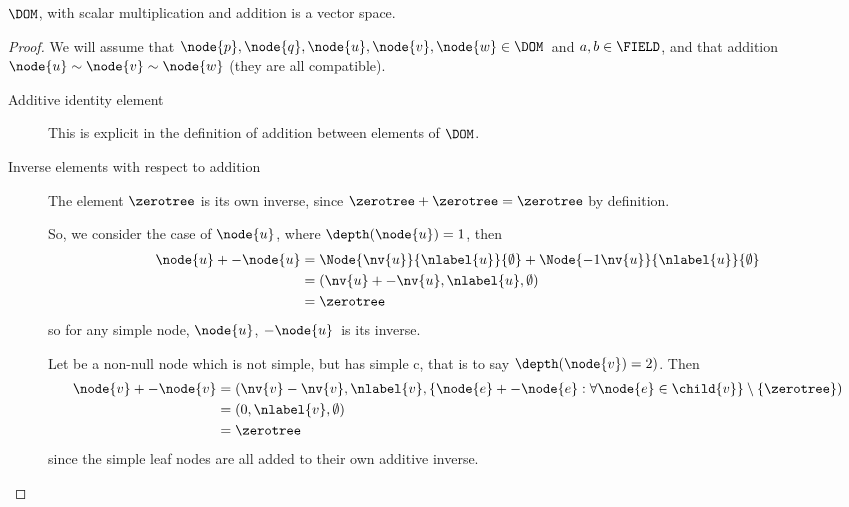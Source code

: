 \begin{proposition}\label{vspace} $\DOM$, with scalar multiplication and addition is a vector space.
  \begin{proof}
    We will assume that  \(\node{p}, \node{q}, \node{u},\node{v},\node{w} \in \DOM\)\ and \(a, b \in  \FIELD\), and that
    addition $\node{u} \sim \node{v} \sim \node{w}$ (they are all compatible).

    \vspace{28pt}
    \begin{description} 
    \item[Additive identity element]

      This is explicit in the definition of addition between elements
      of $\DOM$.

    \item[Inverse elements with respect to addition]

      The element \(\zerotree\) is its own inverse, since \(\zerotree
      + \zerotree = \zerotree\) by definition.

      So, we consider the case of $\node{u}$, where \(\depth(\node{u})
      = 1\), then
      \begin{align*}
          \node{u} + -\node{u} &=  \Node{\nv{u}}{\nlabel{u}}{\emptyset} + \Node{-1\nv{u}}{\nlabel{u}}{\emptyset} \\
          &= (\nv{u} + -\nv{u}, \nlabel{u}, \emptyset) \\
          &= \zerotree
      \end{align*}
      so for any simple node, \(\node{u}\), \(-\node{u}\)\ is its
      inverse.

      Let  be a non-null node which is not simple, but has
      simple c, that is to say \(\depth(\node{v}) = 2)\).  Then 
      \begin{align*}
          \node{v} + -\node{v} &= (\nv{v} - \nv{v}, \nlabel{v}, \lbrace \node{e} + -\node{e}: \forall \node{e} \in \child{v}\rbrace \setminus\{\zerotree\}) \\
          &= (0, \nlabel{v}, \emptyset) \\
          &= \zerotree
      \end{align*}
      since the simple leaf nodes are all added to their own additive
      inverse.


\end{description}
\end{proof}
\end{proposition}

